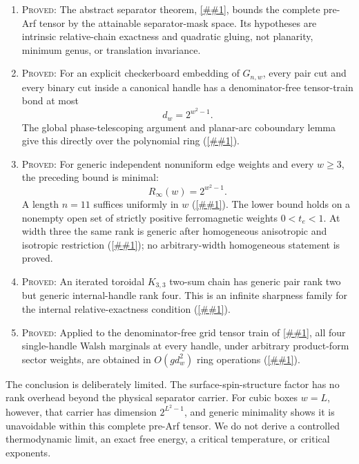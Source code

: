 \documentclass[11pt]{article}
\newcommand{\cref}[1]{\autoref{##1}}%
\newcommand{\claimtag}[1]{\textsc{#1}}
\newcommand{\proved}{\claimtag{Proved}}
\begin{document}
\begin{enumerate}
\item \proved: The abstract separator theorem, \cref{thm:separator}, bounds
  the complete pre-Arf tensor by the attainable separator-mask space.  Its
  hypotheses are intrinsic relative-chain exactness and quadratic gluing,
  not planarity, minimum genus, or translation invariance.

\item \proved: For an explicit checkerboard embedding of \(G_{n,w}\), every
  pair cut and every binary cut inside a canonical handle has a
  denominator-free tensor-train bond at most
  \[
     d_w=2^{w^2-1}.
  \]
  The global phase-telescoping argument and planar-arc coboundary lemma give
  this directly over the polynomial ring (\cref{thm:grid-upper}).

\item \proved: For generic independent nonuniform edge weights and every
  \(w\geq3\), the preceding bound is minimal:
  \begin{equation}\label{eq:g1-intro}
     R_\infty(w)=2^{w^2-1}.
  \end{equation}
  A length \(n=11\) suffices uniformly in \(w\)
  (\cref{thm:grid-tight}).  The lower bound holds on a nonempty open set of
  strictly positive ferromagnetic weights \(0<t_e<1\).  At width three the
  same rank is generic after homogeneous anisotropic and isotropic
  restriction (\cref{thm:w3-homogeneous}); no arbitrary-width homogeneous
  statement is proved.

\item \proved: An iterated toroidal \(K_{3,3}\) two-sum chain has generic
  pair rank two but generic internal-handle rank four.  This is an infinite
  sharpness family for the internal relative-exactness condition
  (\cref{thm:k33}).

\item \proved: Applied to the denominator-free grid tensor train of
  \cref{thm:grid-upper}, all four single-handle Walsh marginals at every
  handle, under arbitrary product-form sector weights, are obtained in
  \(O(gd_w^2)\) ring operations (\cref{thm:marginals}).
\end{enumerate}

The conclusion is deliberately limited.  The surface-spin-structure factor
has no rank overhead beyond the physical separator carrier.  For cubic boxes
\(w=L\), however, that carrier has dimension \(2^{L^2-1}\), and generic
minimality shows it is unavoidable within this complete pre-Arf tensor.  We
do not derive a controlled thermodynamic limit, an exact free energy, a
critical temperature, or critical exponents.
\end{document}
